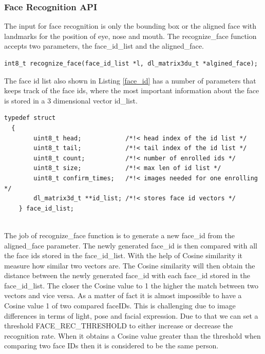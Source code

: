\subsubsection{Face Recognition API} 

The input for face recognition is only the bounding box or the aligned face with landmarks for the position of eye, nose and mouth. The {\selectfont recognize\_face} function accepts two parameters, the {\selectfont face\_id\_list} and the {\selectfont aligned\_face}.
\begin{lstlisting}[caption={Face Recognition API},label=face_rec, captionpos=b]
int8_t recognize_face(face_id_list *l, dl_matrix3du_t *algined_face);
\end{lstlisting}

The face id list also shown in Listing \ref{face_id} has a number of parameters that keeps track of the face ids, where the most important information about the face is stored in a 3 dimensional vector {\selectfont id\_list}. 





\begin{lstlisting}[caption={Face Id List},label=face_id, captionpos=b]
typedef struct
  {
        uint8_t head;            /*!< head index of the id list */
        uint8_t tail;            /*!< tail index of the id list */
        uint8_t count;           /*!< number of enrolled ids */
        uint8_t size;            /*!< max len of id list */
        uint8_t confirm_times;   /*!< images needed for one enrolling */
        dl_matrix3d_t **id_list; /*!< stores face id vectors */
    } face_id_list;
    
    \end{lstlisting}

The job of {\selectfont recognize\_face} function is to generate a new {\selectfont face\_id} from the {\selectfont aligned\_face} parameter. The newly generated {\selectfont face\_id} is then compared with all the face ids stored in the {\selectfont face\_id\_list}. With the help of Cosine similarity it measure how similar two vectors are. The Cosine similarity will then obtain the distance between the newly generated {\selectfont face\_id} with each {\selectfont face\_id} stored in the {\selectfont face\_id\_list}. The closer the Cosine value to 1 the higher the match between two vectors and vice versa. As a matter of fact it is almost impossible to have a Cosine value 1 of two compared faceIDs. This is challenging due to image differences in terms of light, pose and facial expression. Due to that we can set a threshold {\selectfont FACE\_REC\_THRESHOLD}  to either increase or decrease the recognition rate. When it obtains a Cosine value greater than the threshold when comparing two face IDs then it is considered to be the same person. 

